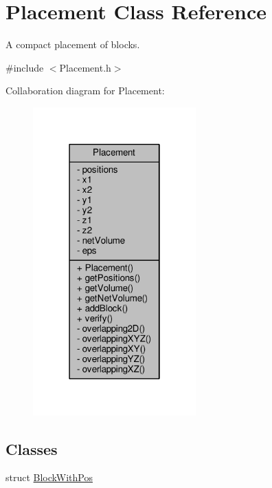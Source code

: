 \hypertarget{classPlacement}{}\section{Placement Class Reference}
\label{classPlacement}


A compact placement of blocks.  




{\ttfamily \#include $<$Placement.\+h$>$}



Collaboration diagram for Placement\+:
\nopagebreak
\begin{figure}[H]
\begin{center}
\leavevmode
\includegraphics[width=178pt]{classPlacement__coll__graph}
\end{center}
\end{figure}
\subsection*{Classes}
\begin{DoxyCompactItemize}
\item 
struct \hyperlink{structPlacement_1_1BlockWithPos}{Block\+With\+Pos}
\end{DoxyCompactItemize}
